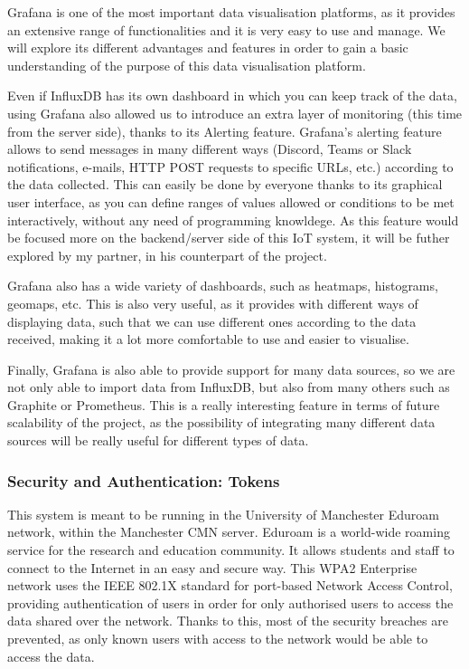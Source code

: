 \documentclass[12pt]{article}
\begin{document}
Grafana is one of the most important data visualisation platforms, as it provides an extensive range of functionalities and it is very easy to use and manage. We will explore its different advantages and features in order to gain a basic understanding of the purpose of this data visualisation platform.\par

Even if InfluxDB has its own dashboard in which you can keep track of the data, using Grafana also allowed us to introduce an extra layer of monitoring (this time from the server side), thanks to its Alerting feature. Grafana's alerting feature allows to send messages in many different ways (Discord, Teams or Slack notifications, e-mails, HTTP POST requests to specific URLs, etc.) according to the data collected. This can easily be done by everyone thanks to its graphical user interface, as you can define ranges of values allowed or conditions to be met interactively, without any need of programming knowldege. As this feature would be focused more on the backend/server side of this IoT system, it will be futher explored by my partner, in his counterpart of the project.

Grafana also has a wide variety of dashboards, such as heatmaps, histograms, geomaps, etc. This is also very useful, as it provides with different ways of displaying data, such that we can use different ones according to the data received, making it a lot more comfortable to use and easier to visualise.\par

Finally, Grafana is also able to provide support for many data sources, so we are not only able to import data from InfluxDB, but also from many others such as Graphite or Prometheus. This is a really interesting feature in terms of future scalability of the project, as the possibility of integrating many different data sources will be really useful for different types of data.

\subsubsection{Security and Authentication: Tokens}

This system is meant to be running in the University of Manchester Eduroam network, within the Manchester CMN server. Eduroam is a world-wide roaming service for the research and education community. It allows students and staff to connect to the Internet in an easy and secure way. This WPA2 Enterprise network uses the IEEE 802.1X standard for port-based Network Access Control, providing authentication of users in order for only authorised users to access the data shared over the network. Thanks to this, most of the security breaches are prevented, as only known users with access to the network would be able to access the data. \par 
\end{document}
